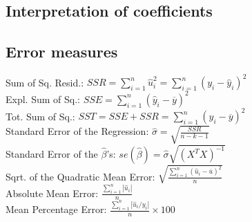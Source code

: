 \documentclass[10pt, a4paper, landscape]{extarticle}
\begin{document}
\begin{multicols}{3}
	\subsection*{Interpretation of coefficients}
	\subsection*{Error measures}
		Sum of Sq. Resid.: \hfill $SSR = \sum_{i=1}^n \hat{u}_i^2 = \sum_{i=1}^n (y_i - \hat{y}_i)^2$
		\\ Expl. Sum of Sq.: \hfill $SSE = \sum_{i=1}^n (\hat{y}_i - \overline{y})^2$
		\\ Tot. Sum of Sq.: \hfill $SST = SSE + SSR = \sum_{i=1}^n (y_i - \overline{y})^2$
		\\ Standard Error of the Regression: \hfill $\hat{\sigma} = \sqrt{\frac{SSR}{n-k-1}}$
		\\ Standard Error of the $\hat{\beta}$'s: \hfill $se(\hat{\beta}) = \hat{\sigma} \sqrt{(X^T X)^{-1}}$
		\\ Sqrt. of the Quadratic Mean Error: \hfill $\sqrt{\frac{\sum_{i=1}^n (\hat{u}_i - \overline{u})^2}{n}}$
		\\ Absolute Mean Error: \hfill $\frac{\sum_{i=1}^n |\hat{u}_i|}{n}$
		\\ Mean Percentage Error: \hfill $\frac{\sum_{i=1}^n |\hat{u}_i / y_i|}{n} \times 100$

\columnbreak


\end{multicols}
\end{document}
